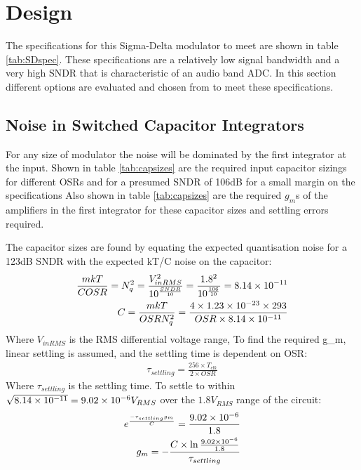 \section{Design}
\label{Design}
The specifications for this Sigma-Delta modulator to meet are shown in table \ref{tab:SDspec}.
These specifications are a relatively low signal bandwidth and a very high SNDR that is characteristic of an audio band ADC.
In this section different options are evaluated and chosen from to meet these specifications.



\subsection{Noise in  Switched Capacitor Integrators}
\label{Design:noise}
For any size of modulator the noise will be dominated by the first integrator at the input\cite{lecturenotes}.
Shown in table \ref{tab:capsizes} are the required input capacitor sizings for different OSRs and for a presumed SNDR of 106dB for a small margin on the specifications
Also shown in table \ref{tab:capsizes} are the required $g_{m}$s of the amplifiers in the first integrator for these capacitor sizes and settling errors required.

The capacitor sizes are found by equating the expected quantisation noise for a 123dB SNDR with the expected kT/C noise on the capacitor:
\begin{align}
    \frac{m k T}{C OSR} = N_{q}^{2} = \frac{V_{inRMS}^{2}}{10^{\frac{SNDR}{10}}} = \frac{1.8^{2}}{10^{\frac{106}{10}}} = 8.14\times 10^{-11} \\
    C = \frac{m k T}{OSR N_{q}^{2}} = \frac{4 \times 1.23\times 10^{-23} \times 293}{OSR \times 8.14\times 10^{-11}} 
\end{align}
Where $V_{inRMS}$ is the RMS differential voltage range,
To find the required g_{m}, linear settling is assumed, and the settling time is dependent on OSR:
\begin{align}
    \tau_{settling} = \frac{256\times T_{clk}}{2\times OSR}
\end{align}
Where $\tau_{settling}$ is the settling time.
To settle to within $\sqrt{8.14\times 10^{-11}} = 9.02\times 10^{-6} V_{RMS}$ over the $1.8 V_{RMS}$ range of the circuit:
\begin{align}
    e^{\frac{-\tau_{settling} g_{m}}{C}} = \frac{9.02\times 10^{-6}}{1.8} \\
    g_{m}  = - \frac{C \times \ln{\frac{9.02\ensuremath{\times 10^{-6}}}{1.8}}}{\tau_{settling}}
\end{align}

